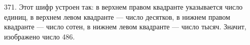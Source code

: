 371. Этот шифр устроен так: в верхнем правом квадранте указывается число единиц, в верхнем левом квадранте --- число десятков,
в нижнем правом квадранте --- число сотен, в нижнем левом квадранте --- число тысяч. Значит, изображено число 486.\\
